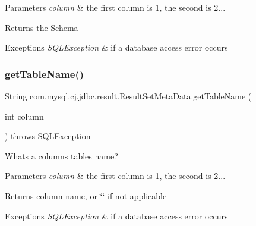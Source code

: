 \begin{DoxyParams}{Parameters}
{\em column} & the first column is 1, the second is 2...\\
\hline
\end{DoxyParams}
\begin{DoxyReturn}{Returns}
the Schema
\end{DoxyReturn}

\begin{DoxyExceptions}{Exceptions}
{\em S\+Q\+L\+Exception} & if a database access error occurs \\
\hline
\end{DoxyExceptions}
\mbox{\label{classcom_1_1mysql_1_1cj_1_1jdbc_1_1result_1_1_result_set_meta_data_a8a562f4a15f95b436faccb17586dd031}} 
\subsubsection{\texorpdfstring{get\+Table\+Name()}{getTableName()}}
{\footnotesize\ttfamily String com.\+mysql.\+cj.\+jdbc.\+result.\+Result\+Set\+Meta\+Data.\+get\+Table\+Name (\begin{DoxyParamCaption}\item[{int}]{column }\end{DoxyParamCaption}) throws S\+Q\+L\+Exception}

Whats a column\textquotesingle{}s table\textquotesingle{}s name?


\begin{DoxyParams}{Parameters}
{\em column} & the first column is 1, the second is 2...\\
\hline
\end{DoxyParams}
\begin{DoxyReturn}{Returns}
column name, or \char`\"{}\char`\"{} if not applicable
\end{DoxyReturn}

\begin{DoxyExceptions}{Exceptions}
{\em S\+Q\+L\+Exception} & if a database access error occurs \\
\hline
\end{DoxyExceptions}
\mbox{\label{classcom_1_1mysql_1_1cj_1_1jdbc_1_1result_1_1_result_set_meta_data_a9983a9e7e92e9e9fcbe77ff2f142fdf3}} 
